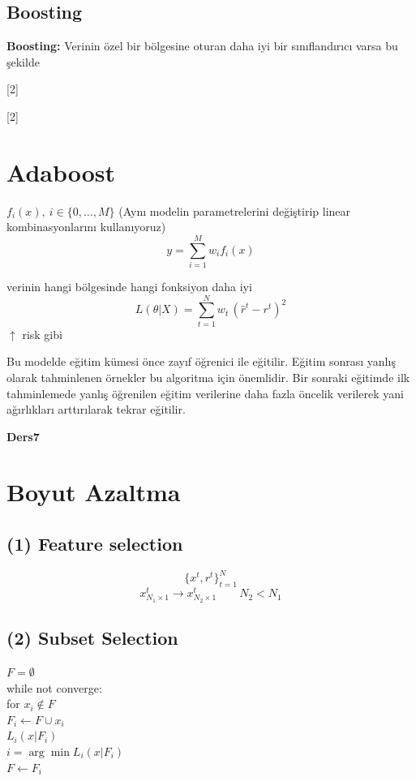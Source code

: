 \documentclass[11pt,a4paper]{article}
\begin{document}
\subsection{Boosting}

\textbf{Boosting:} Verinin özel bir bölgesine oturan daha iyi bir sınıflandırıcı varsa bu şekilde 

[2]

[2]


\section{Adaboost}

$f_i(x),\ i\in\{0,\dots,M\}$ \quad (Aynı modelin parametrelerini değiştirip linear kombinasyonlarını kullanıyoruz)
\[ y=\sum_{i=1}^{M} w_i f_i(x) \]

verinin hangi bölgesinde hangi fonksiyon daha iyi
\[ L(\theta|X)=\sum_{t=1}^{N} w_t\,(\hat{r}^t-r^t)^2 \]
$\uparrow$ risk gibi

Bu modelde eğitim kümesi önce zayıf öğrenici ile eğitilir. Eğitim sonrası yanlış olarak tahminlenen örnekler bu algoritma için önemlidir. Bir sonraki eğitimde ilk tahminlemede yanlış öğrenilen eğitim verilerine daha fazla öncelik verilerek yani ağırlıkları arttırılarak tekrar eğitilir.

\textbf{Ders7}

\section{Boyut Azaltma}

\subsection{(1) Feature selection}
\[ \{x^t, r^t\}_{t=1}^{N} \]
\[ x^t_{N_1\times 1} \to x^t_{N_2\times 1} \qquad N_2<N_1 \]

\subsection{(2) Subset Selection}
\noindent $F=\emptyset$\\
while not converge:\\
\hspace*{2em}for $x_i\notin F$\\
\hspace*{4em}$F_i \leftarrow F\cup x_i$\\
\hspace*{4em}$L_i(x|F_i)$\\
\hspace*{2em}$i=\arg\min L_i(x|F_i)$\\
\hspace*{2em}$F\leftarrow F_i$
\end{document}
